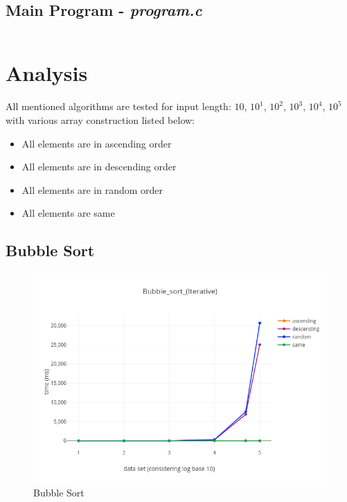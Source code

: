 \documentclass[paper=letter, fontsize=12pt]{article}
\begin{document}
\subsection{Main Program - \textbf{\textit{program.c}}}
\inputminted[frame=lines, breaklines, linenos]{c}{../program.c}

\section{Analysis}
All mentioned algorithms are tested for input length: $ 10 $, $ 10^1 $, $ 10^2 $, $ 10^3 $, $ 10^4 $, $ 10^5 $
with various array construction listed below:
\begin{itemize}
	\item All elements are in ascending order
	\item All elements are in descending order
	\item All elements are in random order
	\item All elements are same
\end{itemize}
\subsection{Bubble Sort}
\begin{figure}[H]
	\centering
	\includegraphics[scale=0.75]{../analysis/Bubble_sort_(Iterative).png}
	\caption{Bubble Sort}
\end{figure}
\end{document}
